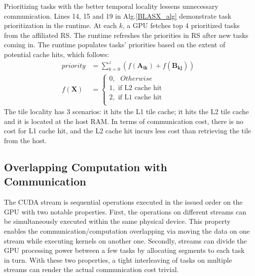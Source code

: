 \documentclass[conference]{IEEEtran}
\begin{document}
Prioritizing tasks with the better temporal locality lessens unnecessary communication.
Lines 14, 15 and 19 in Alg.\ref{BLASX_alg} demonstrate task prioritization in the runtime.
At each $k$, a GPU fetches top 4 prioritized tasks from the affiliated RS. The runtime refreshes 
the priorities in RS after new tasks coming in. The runtime populates tasks' priorities
based on the extent of potential cache hits, which follows:
\vspace{-0.1in}
\begin{subequations}
 \label{tile_priority}
 \begin{align}
  priority &= \sum \limits_{k=0}^{z} \left(f(\mathbf{A_{ik}}) + f(\mathbf{B_{kj}})\right) \label{priority1} \\
  f(\mathbf{X}) &= \begin{cases} 0, \mbox{      }Otherwise\\
                                 1, \mbox{      if L2 cache hit}\\
                                 2, \mbox{      if L1 cache hit}\\
                   \end{cases}
\end{align}
\end{subequations}
The tile locality has 3 scenarios: it hits the L1 tile cache; it hits the L2
tile cache and it is located at the host RAM. In terms of communication cost, there is
no cost for L1 cache hit, and the L2 cache hit incurs less cost than retrieving the tile from the host.






\vspace{-0.12in}
\subsection{Overlapping Computation with Communication}
\vspace{-0.05in}
The CUDA stream is sequential operations executed in the issued order on the GPU with two notable properties. First, the operations on different streams can be simultaneously 
executed within the same physical device. This property enables the communication/computation 
overlapping via moving the data on one stream while executing kernels on another one. 
Secondly, streams can divide the GPU processing power between a few tasks by allocating 
segments to each task in turn. With these two properties, a tight interleaving of tasks on 
multiple streams can render the actual communication cost trivial.
\end{document}
